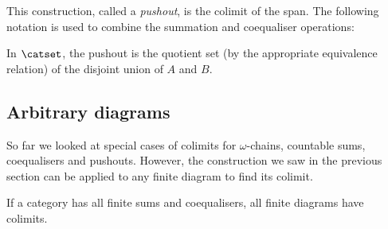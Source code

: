 \begin{center}
\end{center}

This construction, called a \emph{pushout}, is the colimit of the span. The following notation is used to combine the summation and coequaliser operations:

\begin{center}
\end{center}


In $\catset$, the pushout is the quotient set (by the appropriate equivalence relation) of the disjoint union of $A$ and $B$.


\begin{center}
\end{center}

\subsection{Arbitrary diagrams}

So far we looked at special cases of colimits for $\omega$-chains, countable sums, coequalisers and pushouts. However, the construction we saw in the previous section can be applied to any finite diagram to find its colimit.

\begin{proposition}
If a category has all finite sums and coequalisers, all finite diagrams have colimits.
\end{proposition}

